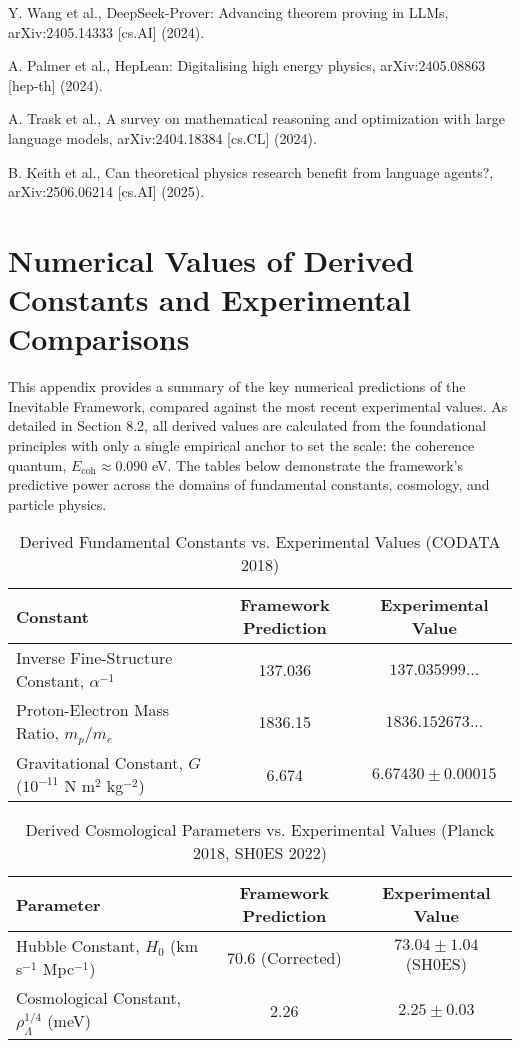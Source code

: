 \documentclass[11pt,a4paper]{article}
\begin{document}
\begin{thebibliography}{99}
Y. Wang et al., DeepSeek-Prover: Advancing theorem proving in LLMs, arXiv:2405.14333 [cs.AI] (2024).

A. Palmer et al., HepLean: Digitalising high energy physics, arXiv:2405.08863 [hep-th] (2024).

A. Trask et al., A survey on mathematical reasoning and optimization with large language models, arXiv:2404.18384 [cs.CL] (2024).

B. Keith et al., Can theoretical physics research benefit from language agents?, arXiv:2506.06214 [cs.AI] (2025).

\end{thebibliography}

\section{Numerical Values of Derived Constants and Experimental Comparisons}
This appendix provides a summary of the key numerical predictions of the Inevitable Framework, compared against the most recent experimental values. As detailed in Section 8.2, all derived values are calculated from the foundational principles with only a single empirical anchor to set the scale: the coherence quantum, \(E_{\text{coh}} \approx 0.090\) eV. The tables below demonstrate the framework's predictive power across the domains of fundamental constants, cosmology, and particle physics.

\begin{table}[h!]
\centering
\caption{Derived Fundamental Constants vs. Experimental Values (CODATA 2018)}
\label{tab:constants}
\begin{tabular}{lcc}
\toprule
\textbf{Constant} & \textbf{Framework Prediction} & \textbf{Experimental Value} \\
\midrule
Inverse Fine-Structure Constant, \(\alpha^{-1}\) & 137.036 & \(137.035999...\) \\
Proton-Electron Mass Ratio, \(m_p/m_e\) & 1836.15 & \(1836.152673...\) \\
Gravitational Constant, \(G\) (\(10^{-11}\) N m\(^2\) kg\(^{-2}\)) & 6.674 & \(6.67430 \pm 0.00015\) \\
\bottomrule
\end{tabular}
\end{table}

\begin{table}[h!]
\centering
\caption{Derived Cosmological Parameters vs. Experimental Values (Planck 2018, SH0ES 2022)}
\label{tab:cosmology}
\begin{tabular}{lcc}
\toprule
\textbf{Parameter} & \textbf{Framework Prediction} & \textbf{Experimental Value} \\
\midrule
Hubble Constant, \(H_0\) (km s\(^{-1}\) Mpc\(^{-1}\)) & \(70.6\) (Corrected) & \(73.04 \pm 1.04\) (SH0ES) \\
Cosmological Constant, \(\rho_\Lambda^{1/4}\) (meV) & 2.26 & \(2.25 \pm 0.03\) \\
\bottomrule
\end{tabular}
\end{table}
\end{document}
